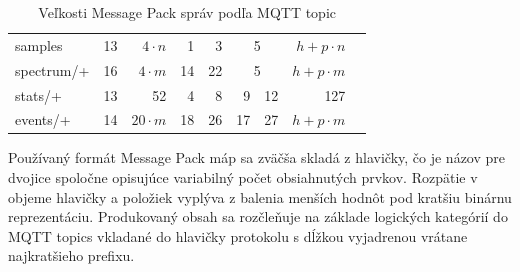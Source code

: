\begin{table}[h]
\begin{tabular}{|l|r|r|rr|cr|r|l}
samples                              & 13                                                                                                        & $4\cdot n$                                                                                                    & \multicolumn{1}{r|}{1}             & 3                                  & \multicolumn{2}{c|}{5}                                                  & $h + p\cdot n$                                                                                                      &           \\ \cline{1-8}
spectrum/+                           & 16                                                                                                        & $4\cdot m$                                                                                                & \multicolumn{1}{r|}{14}            & 22                                 & \multicolumn{2}{c|}{5}                                                  & $h + p\cdot m$                                                                                                 &           \\ \cline{1-8}
stats/+                              & 13                                                                                                        & 52                                                                                                     & \multicolumn{1}{r|}{4}             & 8                                  & \multicolumn{1}{r|}{9}             & 12                                 & 127                                                                                                           &           \\ \cline{1-8}
events/+                             & 14                                                                                                        & $20\cdot m$                                                                                               & \multicolumn{1}{r|}{18}            & 26                                 & \multicolumn{1}{r|}{17}            & 27                                 & $h + p\cdot m$                                                                                                &           \\ \cline{1-8}
\end{tabular}
\caption{Veľkosti Message Pack správ podľa MQTT topic}
\label{tab:msg-size}
\end{table}

Používaný formát Message Pack máp sa zväčša skladá z hlavičky, čo je názov
pre dvojice spoločne opisujúce variabilný počet obsiahnutých prvkov. Rozpätie v objeme hlavičky a položiek vyplýva z
balenia menších hodnôt pod kratšiu binárnu reprezentáciu. Produkovaný obsah sa rozčleňuje na základe logických kategórií
do MQTT topics vkladané do hlavičky protokolu s dĺžkou vyjadrenou vrátane najkratšieho prefixu.

